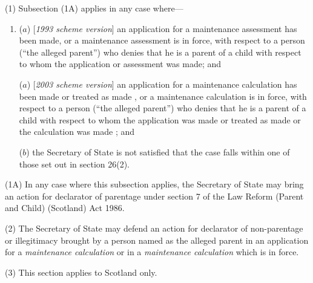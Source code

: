 \documentclass[12pt,a4paper]{article}
\begin{document}
(1) Subsection (1A) applies in any case where—
\begin{enumerate}\item[]
($a$) [\emph{1993 scheme version}] an application for a maintenance assessment has been made, or a maintenance assessment is in force, with respect to a person (“the alleged parent”) who denies that he is a parent of a child with respect to whom the application or assessment was made; and

($a$) [\emph{2003 scheme version}] an application for a 
maintenance calculation  %
has been made
or treated as made%
, or a 
maintenance calculation  %
is in force, with respect to a person (“the alleged parent”) who denies that he is a parent of a child with respect to whom the application 
was made or treated as made or the calculation was made%
; and

($b$) 
the Secretary of State  %
is not satisfied that the case falls within one of those set out in section 26(2).
\end{enumerate}

(1A) In any case where this subsection applies, the Secretary of State may bring an action for declarator of parentage under section 7 of the Law Reform (Parent and Child) (Scotland) Act 1986.

(2) The Secretary of State may defend an action for declarator of non-parentage or illegitimacy brought by a person named as the alleged parent in an application for a 
\emph{maintenance calculation}  %
or in a 
\emph{maintenance calculation}  %
which is in force.  %

(3) This section applies to Scotland only.

\end{document}
